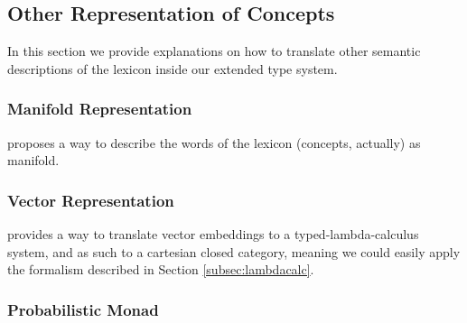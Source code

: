 \subsection{Other Representation of Concepts}
In this section we provide explanations on how to translate other semantic descriptions of the lexicon inside our extended type system.

\subsubsection{Manifold Representation}
\cite{goodaleManifoldsConceptualRepresentations2022} proposes a way to describe the words of the lexicon (concepts, actually) as manifold.

\subsubsection{Vector Representation}
\cite{sadrzadehStaticDynamicVector2018} provides a way to translate vector embeddings to a typed-lambda-calculus system, and as such to a cartesian closed category, meaning we could easily apply the formalism described in Section \ref{subsec:lambdacalc}.

\subsubsection{Probabilistic Monad}
\cite{groveProbabilisticCompositionalSemantics2023}
